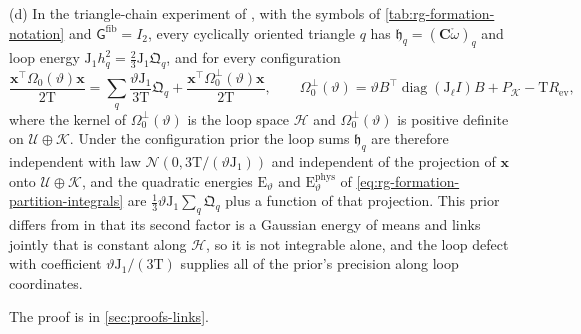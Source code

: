 (d) In the triangle-chain experiment of , with the symbols of
\cref{tab:rg-formation-notation} and $\mathsf G^{\mathrm{fib}}=I_2$, every cyclically oriented triangle
$q$ has $\mathfrak h_q=(\mathbf C\mathring\omega)_q$ and loop energy
$\mathrm J_1h_q^2=\tfrac23\mathrm J_1\mathfrak Q_q$, and for every configuration
\begin{equation}
\frac{\mathbf x^\top\Omega_0(\vartheta)\mathbf x}{2\mathrm T}
=\sum_q\frac{\vartheta\mathrm J_1}{3\mathrm T}\mathfrak Q_q+\frac{\mathbf x^\top\Omega^\perp_0(\vartheta)\mathbf x}{2\mathrm T},
\qquad
\Omega^\perp_0(\vartheta)=\vartheta B^\top\operatorname{diag}(\mathrm J_\ell I)B+P_{\mathcal K}-\mathrm TR_{\mathrm{ev}},
\label{eq:link-triangle-chain-prior}
\end{equation}
where the kernel of $\Omega^\perp_0(\vartheta)$ is the loop space $\mathcal H$ and $\Omega^\perp_0(\vartheta)$ is
positive definite on $\mathcal U\oplus\mathcal K$. Under the configuration prior the loop sums
$\mathfrak h_q$ are therefore independent with law $\mathcal N(0,3\mathrm T/(\vartheta\mathrm J_1))$ and
independent of the projection of $\mathbf x$ onto $\mathcal U\oplus\mathcal K$, and the quadratic energies
$\mathrm E_\vartheta$ and $\mathrm E^{\mathrm{phys}}_\vartheta$ of
\cref{eq:rg-formation-partition-integrals} are $\tfrac13\vartheta\mathrm J_1\sum_q\mathfrak Q_q$ plus a
function of that projection. This prior differs from  in that its second
factor is a Gaussian energy of means and links jointly that is constant along $\mathcal H$, so it is not
integrable alone, and the loop defect with coefficient $\vartheta\mathrm J_1/(3\mathrm T)$ supplies all
of the prior's precision along loop coordinates. 

The proof is in \cref{sec:proofs-links}.


